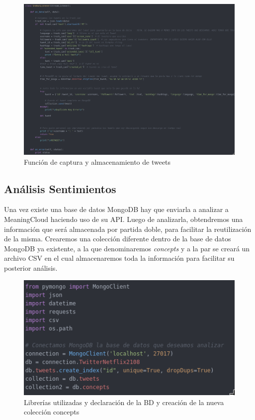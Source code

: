  
 \begin{figure}[H]
 	\centering
 	\includegraphics[scale=.35]{imagenes/codigo-ladron.png}
 	\caption{Función de captura y almacenamiento de tweets}
 	\label{fig:codigo-ladron}
 \end{figure}
















\subsection{Análisis Sentimientos}


Una vez existe una base de datos MongoDB hay que enviarla a analizar a MeaningCloud haciendo uso de su API. Luego de analizarla, obtendremos una información que será almacenada por partida doble, para facilitar la reutilización de la misma. Crearemos una colección diferente dentro de la base de datos MongoDB ya existente, a la que denominaremos \textit{concepts} y a la par se creará un archivo CSV en el cual almacenaremos toda la información para facilitar su posterior análisis. 

\begin{figure}[H]
	\centering
	\includegraphics[scale=.35]{imagenes/include-analisis.png}
	\caption{Librerías utilizadas y declaración de la BD y creación de la nueva colección concepts}
	\label{fig:libreria-analisis}
\end{figure}



